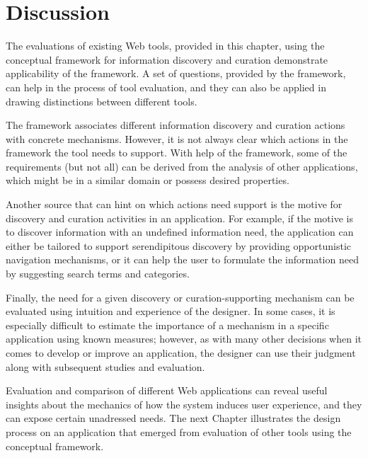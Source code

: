 {\section{Discussion}
The evaluations of existing Web tools, provided in this chapter, using the conceptual framework for information discovery and curation demonstrate applicability of the framework. A set of questions, provided by the framework, can help in the process of tool evaluation, and they can also be applied in drawing distinctions between different tools. 

The framework associates different information discovery and curation actions with concrete mechanisms. However, it is not always clear which actions in the framework the tool needs to support. With help of the framework, some of the requirements (but not all) can be derived from the analysis of other applications, which might be in a similar domain or possess desired properties. 

Another source that can hint on which actions need support is the motive for discovery and curation activities in an application. For example, if the motive is to discover information with an undefined information need, the application  can either be tailored to support serendipitous discovery by providing opportunistic navigation mechanisms, or it can help the user to formulate the information need by suggesting search terms and categories.

Finally, the need for a given discovery or curation-supporting mechanism can be evaluated using intuition and experience of the designer. In some cases, it is especially difficult to estimate the importance of a mechanism in a specific application using known measures; however, as with many other decisions when it comes to develop or improve an application, the designer can use their judgment along with subsequent studies and evaluation. 

Evaluation and comparison of different Web applications can reveal useful insights about the mechanics of how the system induces user experience, and they can expose certain unadressed needs. The next Chapter illustrates the design process on an application that emerged from evaluation of other tools using the conceptual framework. 

} %